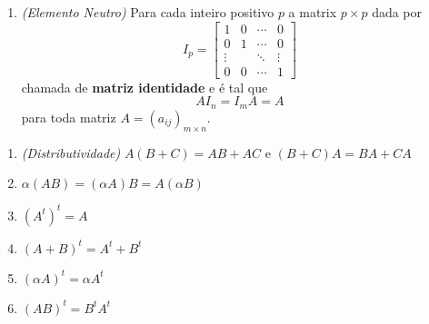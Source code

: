 \documentclass{beamer}
\begin{document}
  \begin{frame}
    \begin{teorema}
      \begin{enumerate}[label={\arabic*)}]
        \conti

        \item \textit{(Elemento Neutro)} Para cada inteiro positivo $p$ a matrix $p \times p$ dada por
          \[
            I_p = \begin{bmatrix}
              1 & 0 & \cdots & 0\\
              0 & 1 & \cdots & 0\\
              \vdots & & \ddots & \vdots\\
              0 & 0 & \cdots & 1
            \end{bmatrix}
          \]
        chamada de \textbf{matriz identidade} e é tal que
        \[
          AI_n = I_mA = A
        \]
        para toda matriz $A = (a_{ij})_{m \times n}$.
      \seti
      \end{enumerate}
    \end{teorema}
  \end{frame}

  \begin{frame}
    \begin{teorema}
      \begin{enumerate}[label={\arabic*)}]
        \conti

        \item \textit{(Distributividade)} $A(B + C) = AB + AC$ e $(B + C)A = BA + CA$

        \item $\alpha(AB) = (\alpha A)B = A(\alpha B)$

        \item $(A^t)^t = A$

        \item $(A + B)^t = A^t + B^t$

        \item $(\alpha A)^t = \alpha A^t$

        \item $(AB)^t = B^tA^t$
      \end{enumerate}
    \end{teorema}
  \end{frame}
\end{document}
